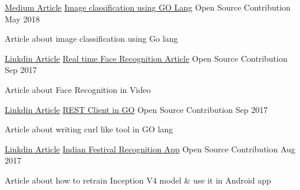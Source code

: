 \begin{cventries}
  \cventry
    {\href{https://medium.com/@ishwarsawale/image-classification-with-go-lang-d72eef451597}{Medium Article}} %
    {\href{https://medium.com/@ishwarsawale/image-classification-with-go-lang-d72eef451597}{Image classification using GO Lang}} %
    {Open Source Contribution} %
    {May 2018} %
    {
      \begin{cvitems} %
        \item {Article about image classification using Go lang}
      \end{cvitems}
    }

  \cventry
    {\href{https://www.linkedin.com/pulse/real-time-face-recognition-using-facenet-ishwar-sawale/}{Linkdin Article}} %
    {\href{https://www.linkedin.com/pulse/real-time-face-recognition-using-facenet-ishwar-sawale/}{Real time Face Recognition Article}} %
    {Open Source Contribution} %
    {Sep 2017} %
    {
      \begin{cvitems} %
        \item {Article about Face Recognition in Video}
      \end{cvitems}
    }

  \cventry
    {\href{https://www.linkedin.com/pulse/writing-command-line-rest-api-client-go-lang-ishwar-sawale/}{Linkdin Article}} %
    {\href{https://www.linkedin.com/pulse/writing-command-line-rest-api-client-go-lang-ishwar-sawale/}{REST Client in GO}} %
    {Open Source Contribution} %
    {Sep 2017} %
    {
      \begin{cvitems} %
        \item {Article about writing curl like tool in GO lang}
      \end{cvitems}
    }
    
  \cventry
    {\href{https://www.linkedin.com/pulse/indian-festival-recognition-app-ishwar-sawale/}{Linkdin Article}} %
    {\href{https://www.linkedin.com/pulse/indian-festival-recognition-app-ishwar-sawale/}{Indian Festival Recognition App}} %
    {Open Source Contribution} %
    {Aug 2017} %
    {
      \begin{cvitems} %
        \item {Article about how to retrain Inception V4 model \& use it in Android app}
      \end{cvitems}
    }


\end{cventries}
